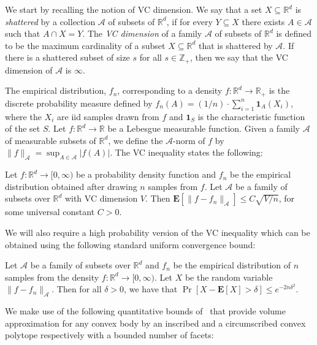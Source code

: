 \documentclass[final,12pt]{colt2018}
\newtheorem{informal theorem}[theorem]{Theorem (informal statement)}
\newcommand{\R}{\mathbb{R}}
\newcommand{\E}{\mathbf{E}}
\begin{document}
\smallskip

We start by recalling the notion of VC dimension.
We say that a set $X \subseteq \mathbb{R}^d$ is \emph{shattered} by a collection $\mathcal{A}$
of subsets of $\R^d$, if for every $Y \subseteq X$ there exists $A \in \mathcal{A}$ such that $A \cap X = Y$.
The \emph{VC dimension} of a family $\mathcal{A}$ of subsets of $\mathbb{R}^d$ 
is defined to be the maximum cardinality of a subset $X \subseteq \mathbb{R}^d$ 
that is shattered by $\mathcal{A}$. If there is a shattered subset of size $s$ 
for all $s \in \mathbb{Z}_+$, then we say that the VC dimension of $\mathcal{A}$ is $\infty$.

The empirical distribution, $f_n$, corresponding to a density $f : \R^d \to \R_+$ 
is the discrete probability measure defined by 
$f_n(A)=(1/n) \cdot \sum_{i=1}^{n} \mathbf{1}_{A}(X_i)$, where the $X_i$ are iid samples drawn
from $f$ and  $\mathbf{1}_{S}$ is the characteristic function of the set $S$.
Let $f : \R^d \to \R$ be a Lebesgue measurable function.
Given a family $\mathcal{A}$ of measurable subsets of $\R^d$, 
we define the $\mathcal{A}$-norm of $f$ by $\|f\|_\mathcal{A} = \sup_{A \in \mathcal{A}}|f(A)|$.
The VC inequality states the following:
\begin{theorem}\label{thm:vc}
Let $f : \R^d \to [0,\infty)$ be a probability density function 
and $f_n$ be the empirical distribution obtained after drawing $n$ samples from $f$. 
Let $\mathcal{A}$ be a family of subsets over $\mathbb{R}^d$ with VC dimension $V$. 
Then $\E[\| f - f_n \|_{\mathcal{A}}] \leq C \sqrt{V / n}$, for some universal constant $C>0$.
\end{theorem}



We will also require a high probability version of the VC inequality
which can be obtained using the following standard uniform convergence bound:

\begin{theorem} \label{thm:A-expect-bound}
Let $\mathcal{A}$ be a family of subsets over $\R^d$ 
and $f_n$ be the empirical distribution of $n$ samples from the density $f: \R^d \to [0,\infty)$. 
Let $X$ be the random variable $\|f - f_n\|_{\mathcal{A}}$. 
Then for all $\delta>0$, we have that
$\Pr[X - \E[X] > \delta] \leq e^{-2n \delta^2}$.
\end{theorem}

We make use of the following quantitative bounds of~\cite{GMR95} 
that provide volume approximation for any convex body 
by an inscribed and a circumscribed convex polytope respectively 
with a bounded number of facets:
\end{document}
